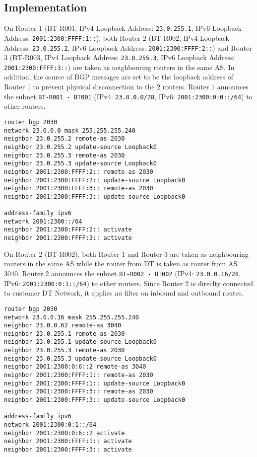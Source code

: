 \subsection{Implementation}

On Router 1 (BT-R001, IPv4 Loopback Address: \texttt{23.0.255.1}, IPv6 Loopback Address: \texttt{2001:2300:FFFF:1::}), both Router 2 (BT-R002, IPv4 Loopback Address: \texttt{23.0.255.2}, IPv6 Loopback Address: \texttt{2001:2300:FFFF:2::}) and Router 3 (BT-R003, IPv4 Loopback Address: \texttt{23.0.255.3}, IPv6 Loopback Address: \texttt{2001:2300:FFFF:3::}) are taken as neighbouring routers in the same AS.
In addition, the source of BGP messages are set to be the loopback address of Router 1 to prevent physical disconnection to the $2$ routers.
Router 1 announces the subnet \texttt{BT-R001 - BT001} (IPv4: \texttt{23.0.0.0/28}, IPv6: \texttt{2001:2300:0:0::/64}) to other routers.

\begin{lstlisting}
router bgp 2030
network 23.0.0.0 mask 255.255.255.240
neighbor 23.0.255.2 remote-as 2030
neighbor 23.0.255.2 update-source Loopback0
neighbor 23.0.255.3 remote-as 2030
neighbor 23.0.255.3 update-source Loopback0
neighbor 2001:2300:FFFF:2:: remote-as 2030
neighbor 2001:2300:FFFF:2:: update-source Loopback0
neighbor 2001:2300:FFFF:3:: remote-as 2030
neighbor 2001:2300:FFFF:3:: update-source Loopback0

address-family ipv6
network 2001:2300::/64
neighbor 2001:2300:FFFF:2:: activate
neighbor 2001:2300:FFFF:3:: activate
\end{lstlisting}

On Router 2 (BT-R002), both Router 1 and Router 3 are taken as neighbouring routers in the same AS while the router from DT is taken as router from AS 3040.
Router 2 announces the subnet \texttt{BT-R002 - BT002} (IPv4: \texttt{23.0.0.16/28}, IPv6: \texttt{2001:2300:0:1::/64}) to other routers.
Since Router 2 is direclty connected to customer DT Network, it applies no filter on inbound and outbound routes.

\begin{lstlisting}
router bgp 2030
network 23.0.0.16 mask 255.255.255.240
neighbor 23.0.0.62 remote-as 3040
neighbor 23.0.255.1 remote-as 2030
neighbor 23.0.255.1 update-source Loopback0
neighbor 23.0.255.3 remote-as 2030
neighbor 23.0.255.3 update-source Loopback0
neighbor 2001:2300:0:6::2 remote-as 3040
neighbor 2001:2300:FFFF:1:: remote-as 2030
neighbor 2001:2300:FFFF:1:: update-source Loopback0
neighbor 2001:2300:FFFF:3:: remote-as 2030
neighbor 2001:2300:FFFF:3:: update-source Loopback0

address-family ipv6
network 2001:2300:0:1::/64
neighbor 2001:2300:0:6::2 activate
neighbor 2001:2300:FFFF:1:: activate
neighbor 2001:2300:FFFF:3:: activate
\end{lstlisting}

